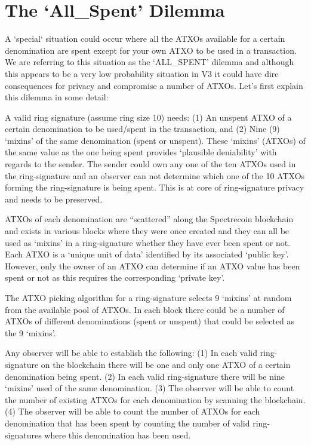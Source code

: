 \section{The ‘All\_Spent’ Dilemma}
A ‘special‘ situation could occur where all the ATXOs available for a certain denomination are spent except 
for your own ATXO to be used in a transaction. We are referring to this situation as the ‘ALL\_SPENT’ 
dilemma and although this appears to be a very low probability situation in V3 it could have dire 
consequences for privacy and compromise a number of ATXOs. Let’s first explain this dilemma in some 
detail: 

 

A valid ring signature (assume ring size 10) needs: (1) An unspent ATXO of a certain denomination to be 
used/spent in the transaction, and (2) Nine (9) ‘mixins’ of the same denomination (spent or unspent). 
These ‘mixins’ (ATXOs) of the same value as the one being spent provides ‘plausible deniability’ with 
regards to the sender. The sender could own any one of the ten ATXOs used in the ring-signature and an 
observer can not determine which one of the 10 ATXOs forming the ring-signature is being spent. This is at 
core of ring-signature privacy and needs to be preserved. 

 

ATXOs of each denomination are “scattered” along the Spectrecoin blockchain and exists in various blocks 
where they were once created and they can all be used as ‘mixins’ in a ring-signature whether they have 
ever been spent or not. Each ATXO is a ‘unique unit of data’ identified by its associated ‘public key’. 
However, only the owner of an ATXO can determine if an ATXO value has been spent or not as this requires 
the corresponding ‘private key’. 



The ATXO picking algorithm for a ring-signature selects 9 ‘mixins’ at random from the available pool of 
ATXOs. In each block there could be a number of ATXOs of different denominations (spent or unspent) that 
could be selected as the 9 ‘mixins’. 

 

Any observer will be able to establish the following: (1) In each valid ring-signature on the blockchain there 
will be one and only one ATXO of a certain denomination being spent. (2) In each valid ring-signature there 
will be nine ‘mixins’ used of the same denomination. (3) The observer will be able to count the number of 
existing ATXOs for each denomination by scanning the blockchain. (4) The observer will be able to count 
the number of ATXOs for each denomination that has been spent by counting the number of valid ring-
signatures where this denomination has been used. 

